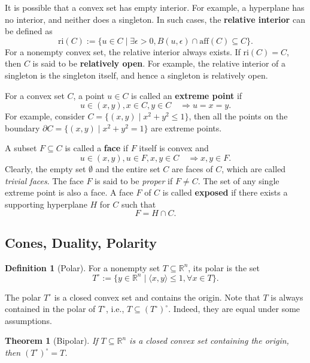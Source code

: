 \documentclass[
]{book}
\newtheorem{theorem}{Theorem}[chapter]
\theoremstyle{definition}
\newtheorem{definition}{Definition}[chapter]
\theoremstyle{definition}
\theoremstyle{definition}
\theoremstyle{definition}
\theoremstyle{remark}
\begin{document}
It is possible that a convex set has empty interior. For example, a hyperplane has no interior, and neither does a singleton. In such cases, the \textbf{relative interior} can be defined as
\[
\mathrm{ri}(C) := \{  u \in C \mid \exists \epsilon > 0, B(u,\epsilon) \cap \mathrm{aff}(C) \subseteq C  \}.
\]
For a nonempty convex set, the relative interior always exists. If \(\mathrm{ri}(C) = C\), then \(C\) is said to be \textbf{relatively open}. For example, the relative interior of a singleton is the singleton itself, and hence a singleton is relatively open.

For a convex set \(C\), a point \(u \in C\) is called an \textbf{extreme point} if
\[
u \in (x,y), x \in C, y \in C \quad \Rightarrow u = x = y.
\]
For example, consider \(C = \{ (x,y)\mid x^2 + y^2 \leq 1 \}\), then all the points on the boundary \(\partial C = \{ (x,y) \mid x^2 + y^2 = 1 \}\) are extreme points.

A subset \(F \subseteq C\) is called a \textbf{face} if \(F\) itself is convex and
\[
u \in (x,y), u \in F, x,y \in C \quad \Rightarrow x,y \in F. 
\]
Clearly, the empty set \(\emptyset\) and the entire set \(C\) are faces of \(C\), which are called \emph{trivial faces}. The face \(F\) is said to be \emph{proper} if \(F \neq C\). The set of any single extreme point is also a face. A face \(F\) of \(C\) is called \textbf{exposed} if there exists a supporting hyperplane \(H\) for \(C\) such that
\[
F = H \cap C.
\]

\subsection{Cones, Duality, Polarity}\label{cones-duality-polarity}

\begin{definition}[Polar]
\protect\hypertarget{def:polar}{}\label{def:polar}For a nonempty set \(T \subseteq \mathbb{R}^{n}\), its polar is the set
\begin{equation}
T^\circ := \{  y \in \mathbb{R}^{n} \mid \langle x, y \rangle \leq 1, \forall x \in T  \}.
\label{eq:polar}
\end{equation}
\end{definition}

The polar \(T^\circ\) is a closed convex set and contains the origin. Note that \(T\) is always contained in the polar of \(T^\circ\), i.e., \(T \subseteq (T^\circ)^\circ\). Indeed, they are equal under some assumptions.

\begin{theorem}[Bipolar]
\protect\hypertarget{thm:bipolar}{}\label{thm:bipolar}If \(T \subseteq \mathbb{R}^{n}\) is a closed convex set containing the origin, then \((T^\circ)^\circ = T\).
\end{theorem}
\end{document}
